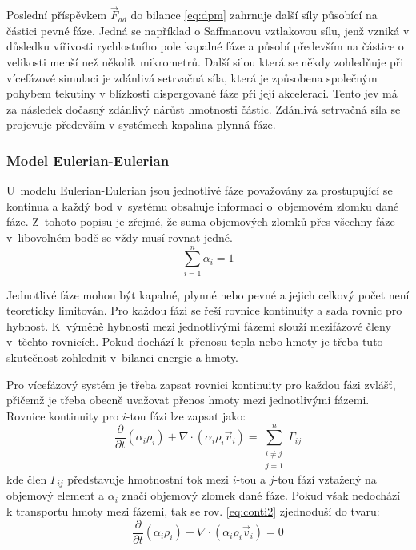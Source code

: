 Poslední příspěvkem $\vec{F}_{ad}$ do bilance \ref{eq:dpm} zahrnuje další síly působící na částici pevné fáze. Jedná se například o Saffmanovu vztlakovou sílu, jenž vzniká v důsledku vířivosti rychlostního pole kapalné fáze a působí především na částice o velikosti menší než několik mikrometrů. Další silou která se někdy zohledňuje při vícefázové simulaci je zdánlivá setrvačná síla, která je způsobena společným pohybem tekutiny v blízkosti dispergované fáze při její akceleraci. Tento jev má za následek dočasný zdánlivý nárůst hmotnosti částic. Zdánlivá setrvačná síla se projevuje především v systémech kapalina-plynná fáze.  

\subsubsection{Model Eulerian-Eulerian}
U~modelu Eulerian-Eulerian jsou jednotlivé fáze považovány za prostupující se kontinua a každý bod v~systému obsahuje informaci o~objemovém zlomku dané fáze. Z~tohoto popisu je zřejmé, že suma objemových zlomků přes všechny fáze v~libovolném bodě se vždy musí rovnat jedné. 
\begin{equation}
	\sum_{i=1}^n \alpha_{i} = 1
	\label{eq:volfrac}
\end{equation} 

Jednotlivé fáze mohou být kapalné, plynné nebo pevné a jejich celkový počet není teoreticky limitován. Pro každou fázi se řeší rovnice kontinuity a sada rovnic pro hybnost. K~výměně hybnosti mezi jednotlivými fázemi slouží mezifázové členy v~těchto rovnicích. Pokud dochází k~přenosu tepla nebo hmoty je třeba tuto skutečnost zohlednit v~bilanci energie a hmoty.    

Pro vícefázový systém je třeba zapsat rovnici kontinuity pro každou fázi zvlášť, přičemž je třeba obecně uvažovat přenos hmoty mezi jednotlivými fázemi. Rovnice kontinuity pro $i$-tou fázi lze zapsat jako:
\begin{equation}
	\frac{\partial}{\partial t} (\alpha_{i}\rho_{i}) +  \nabla \cdot (\alpha_{i}\rho_{i}\vec{v}_{i}) = \sum_{\substack{ i \neq j \\ j=1}}^{n}\Gamma_{ij}
	\label{eq:conti2}
\end{equation} 
kde člen $\Gamma_{ij}$ představuje hmotnostní tok mezi $i$-tou a $j$-tou fází vztažený na objemový element a $\alpha_{i}$ značí objemový zlomek dané fáze. Pokud však nedochází k transportu hmoty mezi fázemi, tak se rov. \ref{eq:conti2} zjednoduší do tvaru:
\begin{equation}
	\frac{\partial}{\partial t} (\alpha_{i}\rho_{i}) +  \nabla \cdot (\alpha_{i}\rho_{i}\vec{v}_{i}) = 0
	\label{eq:conti3}
\end{equation} 

